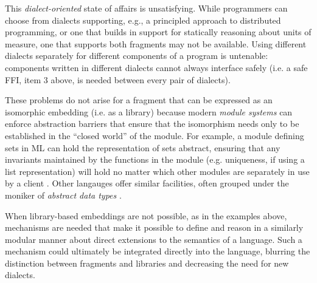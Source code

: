 \documentclass[10pt,preprint]{sigplanconf}
\begin{document}
This \emph{dialect-oriented} state of affairs is unsatisfying. %
While programmers can choose from dialects supporting, e.g., a principled approach to distributed programming, or one that builds in support for statically reasoning about units of measure, one that supports both fragments may not be available. Using different dialects separately for different components of a program is untenable: components written in different dialects cannot always interface safely (i.e. a safe FFI, item 3 above, is needed between every pair of dialects). 

These problems do not arise for a fragment that can be expressed as an isomorphic embedding (i.e. as a library) because modern \emph{module systems} can enforce abstraction barriers that ensure that the isomorphism needs only to be established in the ``closed world'' of the module. For example, a module defining sets in ML can hold the representation of sets abstract, ensuring that any invariants maintained by the functions in the module (e.g. uniqueness, if using a list representation) will hold no matter which other modules are separately in use by a client \cite{harper1997programming}. Other langauges offer similar facilities, often grouped under the moniker of \emph{abstract data types} \cite{liskov1974programming}. %

When library-based embeddings are not possible, as in the examples above, mechanisms are needed that make it possible to define and  reason in a similarly modular manner about  direct extensions to the semantics of a language. Such a mechanism could ultimately be integrated directly into the language, blurring the distinction between fragments and libraries and decreasing the need for new dialects.%
\end{document}

